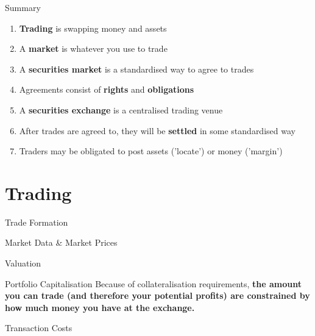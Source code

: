 \documentclass{beamer}
\begin{document}
\begin{frame}{Summary}
	\begin{enumerate}
		\item \textbf{Trading} is swapping money and assets
		\item A \textbf{market} is whatever you use to trade
		\item A \textbf{securities market} is a standardised way to agree to trades
		\item Agreements consist of \textbf{rights} and \textbf{obligations}
		\item A \textbf{securities exchange} is a centralised trading venue
		\item After trades are agreed to, they will be \textbf{settled} in some standardised way
		\item Traders may be obligated to post assets ('locate') or money ('margin')
	\end{enumerate}
\end{frame}

\section{Trading}
\begin{frame}{Trade Formation}
\end{frame}

\begin{frame}{Market Data \& Market Prices}
\end{frame}

\begin{frame}{Valuation}
	\begin{block}{Portfolio Capitalisation}
		Because of collateralisation requirements, \textbf{the amount you can trade (and therefore your potential profits) are constrained by how much money you have at the exchange.}
	\end{block}
	
\end{frame}

\begin{frame}{Transaction Costs}


\end{frame}
\end{document}
